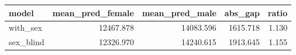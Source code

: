 \begin{tabular}{lrrrr}
\toprule
model & mean_pred_female & mean_pred_male & abs_gap & ratio \\
\midrule
with_sex & 12467.878 & 14083.596 & 1615.718 & 1.130 \\
sex_blind & 12326.970 & 14240.615 & 1913.645 & 1.155 \\
\bottomrule
\end{tabular}
